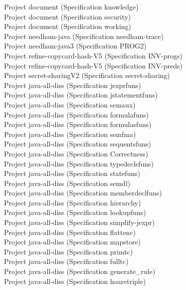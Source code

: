 \documentclass[a4paper]{article}
\begin{document}
\begin{itemize}
Project document (Specification knowledge) \\
Project document (Specification security) \\
Project document (Specification working) \\
Project needham-java (Specification needham-trace) \\
Project needham-java3 (Specification PROG2) \\
Project refine-copycard-hash-V5 (Specification INV-progs) \\
Project refine-copycard-hash-V5 (Specification INV-preds) \\
Project secret-sharingV2 (Specification secret-sharing) \\
Project java-all-diss (Specification jexprfuns) \\
Project java-all-diss (Specification jstatementfuns) \\
Project java-all-diss (Specification semaux) \\
Project java-all-diss (Specification formulafuns) \\
Project java-all-diss (Specification formulasfuns) \\
Project java-all-diss (Specification semfma) \\
Project java-all-diss (Specification sequentsfuns) \\
Project java-all-diss (Specification Correctness) \\
Project java-all-diss (Specification typedeclsfuns) \\
Project java-all-diss (Specification statefuns) \\
Project java-all-diss (Specification semdl) \\
Project java-all-diss (Specification memberdeclfuns) \\
Project java-all-diss (Specification hierarchy) \\
Project java-all-diss (Specification lookupfuns) \\
Project java-all-diss (Specification simplify-jexpr) \\
Project java-all-diss (Specification flattenc) \\
Project java-all-diss (Specification mapstore) \\
Project java-all-diss (Specification primtc) \\
Project java-all-diss (Specification fulltc) \\
Project java-all-diss (Specification generate\_rule) \\
Project java-all-diss (Specification hoaretriple) \\

\end{itemize}
\end{document}

